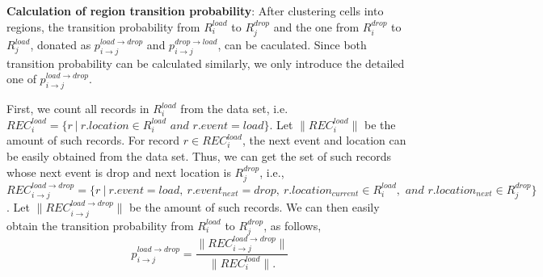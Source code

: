 \textbf{Calculation of region transition probability}: After clustering cells into regions, the transition probability from $R_i^{load}$ to $R_j^{drop}$ and the one from $R_i^{drop}$ to $R_j^{load}$, donated as $p_{i\rightarrow j}^{load\rightarrow drop}$ and $p_{i\rightarrow j}^{drop\rightarrow load}$, can be caculated. Since both transition probability can be calculated similarly, we only introduce the detailed one of $p_{i\rightarrow j}^{load\rightarrow drop}$.

First, we count all records in $R_i^{load}$ from the data set,  i.e. $REC_i^{load}=\{r~|~r.location\in{R_i^{load} \textit{ and }  r.event=load}\}$. Let $\|REC_i^{load}\|$ be the amount of such records. For record $r \in REC_i^{load}$, the next event and location can be easily obtained from the data set. Thus, we can get the set of such records whose next event is drop and next location is $R_j^{drop}$, i.e., $REC_{i\to j}^{load\to drop}=\{r~|~r.event=load,~r.event_{next}=drop,~r.location_{current}\in R_i^{load}, \textit{ and }  r.location_{next}\in R_j^{drop}\}$. Let $\|REC_{i\to j}^{load\to drop}\|$ be the amount of such records. We can then easily obtain the transition probability from $R_i^{load}$ to $R_j^{drop}$, as follows,
\[p_{i \to j}^{load \to drop} = \frac{\|REC_{i\to j}^{load\to drop}\|}{\|REC_i^{load}\|.}\]





